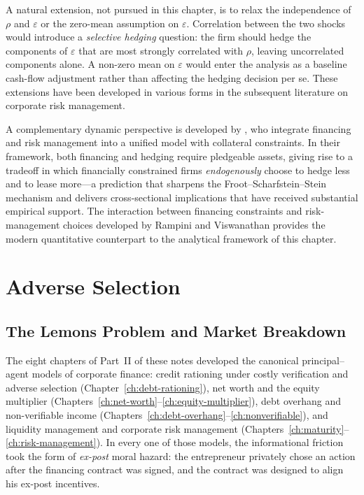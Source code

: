 \documentclass[11pt,a4paper,oneside]{book}
\theoremstyle{plain}
\theoremstyle{definition}
\theoremstyle{remark}
\numberwithin{equation}{chapter}
\begin{document}
A natural extension, not pursued in this chapter, is to relax the independence of $\rho$ and $\varepsilon$ or the zero-mean assumption on $\varepsilon$.
Correlation between the two shocks would introduce a \emph{selective hedging} question: the firm should hedge the components of $\varepsilon$ that are most strongly correlated with $\rho$, leaving uncorrelated components alone.
A non-zero mean on $\varepsilon$ would enter the analysis as a baseline cash-flow adjustment rather than affecting the hedging decision per se.
These extensions have been developed in various forms in the subsequent literature on corporate risk management.

A complementary dynamic perspective is developed by \citet{RampiniViswanathan2013}, who integrate financing and risk management into a unified model with collateral constraints.
In their framework, both financing and hedging require pledgeable assets, giving rise to a tradeoff in which financially constrained firms \emph{endogenously} choose to hedge less and to lease more---a prediction that sharpens the Froot--Scharfstein--Stein mechanism and delivers cross-sectional implications that have received substantial empirical support.
The interaction between financing constraints and risk-management choices developed by Rampini and Viswanathan provides the modern quantitative counterpart to the analytical framework of this chapter.


\part{Adverse Selection}


\chapter{The Lemons Problem and Market Breakdown}
\label{ch:lemons}

The eight chapters of Part~II of these notes developed the canonical principal--agent models of corporate finance: credit rationing under costly verification and adverse selection (Chapter~\ref{ch:debt-rationing}), net worth and the equity multiplier (Chapters~\ref{ch:net-worth}--\ref{ch:equity-multiplier}), debt overhang and non-verifiable income (Chapters~\ref{ch:debt-overhang}--\ref{ch:nonverifiable}), and liquidity management and corporate risk management (Chapters~\ref{ch:maturity}--\ref{ch:risk-management}).
In every one of those models, the informational friction took the form of \emph{ex-post} moral hazard: the entrepreneur privately chose an action after the financing contract was signed, and the contract was designed to align his ex-post incentives.
\end{document}
